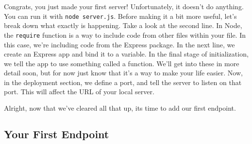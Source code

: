 Congrats, you just made your first server! Unfortunately, it doesn't do anything. You can run it with \texttt{node server.js}. Before making it a bit more useful, let's break down what exactly is happening. Take a look at the second line. In Node, the \texttt{require} function is a way to include code from other files within your file. In this case, we're including code from the Express package. In the next line, we create an Express app and bind it to a variable. In the final stage of initialization, we tell the app to use something called a  function. We'll get into these in more detail soon, but for now just know that it's a way to make your life easier. Now, in the deployment section, we define a port, and tell the server to listen on that port. This will affect the URL of your local server.

Alright, now that we've cleared all that up, its time to add our first endpoint.

\subsection*{Your First Endpoint}
